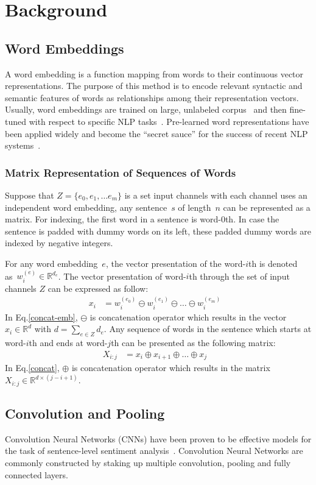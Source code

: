 \section{Background}
\subsection{Word Embeddings}
A word embedding is a function mapping from words to their continuous vector representations.
The purpose of this method is to encode relevant syntactic and semantic features of words as relationships among their representation vectors.
Usually, word embeddings are trained on large, unlabeled corpus~\cite{glove,word2vec} and then fine-tuned with respect to specific NLP tasks~\cite{treeLSTM,KimCNN}.
Pre-learned word representations have been applied widely and become the ``secret sauce'' for the success of recent NLP systems~\cite{Luong_betterword}.
\subsubsection{Matrix Representation of Sequences of Words}
Suppose that \(Z = \{e_0, e_1, \ldots e_m\}\) is a set input channels with each channel uses an independent word embedding, any sentence~\(s\) of length~\(n\) can be represented as a matrix.
For indexing, the first word in a sentence is word-\(0\)th.
In case the sentence is padded with dummy words on its left, these padded dummy words are indexed by negative integers.

For any word embedding~\(e\), the vector presentation of the word-\(i\)th is denoted as~\(w^{(e)}_i \in \mathbb{R}^{d_e}\).
The vector presentation of word-\(i\)th through the set of input channels \(Z\) can be expressed as follow:
\begin{align}
 x_i &= w^{(e_0)}_i \ominus w^{(e_1)}_i \ominus  \ldots \ominus w^{(e_m)}_i&\label{concat-emb}
\end{align}
In Eq.\eqref{concat-emb}, \(\ominus\) is concatenation operator which results in the vector \(x_i \in \mathbb{R}^{d}\) with \(d = \sum_{e \in Z} d_e\).
Any sequence of words in the sentence which starts at word-\(i\)th and ends at word-\(j\)th can be presented as the following matrix:
\begin{align}
X_{i:j} &= x_i \oplus x_{i+1} \oplus \ldots \oplus x_j &\label{concat}
\end{align}
In Eq.\eqref{concat}, \(\oplus\) is concatenation operator which results in the matrix \(X_{i:j} \in \mathbb{R}^{d \times (j-i+1)}\).
\subsection{Convolution and Pooling}\label{sec:cnn}
Convolution Neural Networks (CNNs) have been proven to be effective models for the task of sentence-level sentiment analysis~\cite{KimCNN, DCNN,2-layer-cnn}.
Convolution Neural Networks are commonly constructed by staking up multiple convolution, pooling and fully connected layers.
